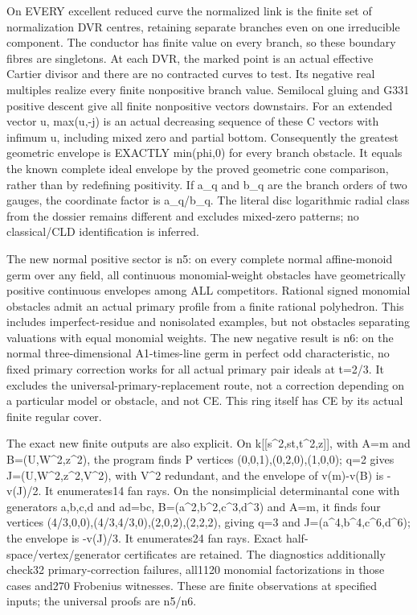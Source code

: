 \documentclass[11pt]{article}
\begin{document}
On EVERY excellent reduced curve the normalized link is the finite set of normalization DVR centres, retaining separate branches even on one irreducible component. The conductor has finite value on every branch, so these boundary fibres are singletons. At each DVR, the marked point is an actual effective Cartier divisor and there are no contracted curves to test. Its negative real multiples realize every finite nonpositive branch value. Semilocal gluing and G331 positive descent give all finite nonpositive vectors downstairs. For an extended vector u, max(u,-j) is an actual decreasing sequence of these C vectors with infimum u, including mixed zero and partial bottom. Consequently the greatest geometric envelope is EXACTLY min(phi,0) for every branch obstacle. It equals the known complete ideal envelope by the proved geometric cone comparison, rather than by redefining positivity. If a\_q and b\_q are the branch orders of two gauges, the coordinate factor is a\_q/b\_q. The literal disc logarithmic radial class from the dossier remains different and excludes mixed-zero patterns; no classical/CLD identification is inferred.

The new normal positive sector is n5: on every complete normal affine-monoid germ over any field, all continuous monomial-weight obstacles have geometrically positive continuous envelopes among ALL competitors. Rational signed monomial obstacles admit an actual primary profile from a finite rational polyhedron. This includes imperfect-residue and nonisolated examples, but not obstacles separating valuations with equal monomial weights. The new negative result is n6: on the normal three-dimensional A1-times-line germ in perfect odd characteristic, no fixed primary correction works for all actual primary pair ideals at t=2/3. It excludes the universal-primary-replacement route, not a correction depending on a particular model or obstacle, and not CE. This ring itself has CE by its actual finite regular cover.

The exact new finite outputs are also explicit. On k[[s\textasciicircum{}2,st,t\textasciicircum{}2,z]], with A=m and B=(U,W\textasciicircum{}2,z\textasciicircum{}2), the program finds P vertices (0,0,1),(0,2,0),(1,0,0); q=2 gives J=(U,W\textasciicircum{}2,z\textasciicircum{}2,V\textasciicircum{}2), with V\textasciicircum{}2 redundant, and the envelope of v(m)-v(B) is -v(J)/2. It enumerates14 fan rays. On the nonsimplicial determinantal cone with generators a,b,c,d and ad=bc, B=(a\textasciicircum{}2,b\textasciicircum{}2,c\textasciicircum{}3,d\textasciicircum{}3) and A=m, it finds four vertices (4/3,0,0),(4/3,4/3,0),(2,0,2),(2,2,2), giving q=3 and J=(a\textasciicircum{}4,b\textasciicircum{}4,c\textasciicircum{}6,d\textasciicircum{}6); the envelope is -v(J)/3. It enumerates24 fan rays. Exact half-space/vertex/generator certificates are retained. The diagnostics additionally check32 primary-correction failures, all1120 monomial factorizations in those cases and270 Frobenius witnesses. These are finite observations at specified inputs; the universal proofs are n5/n6.
\end{document}
